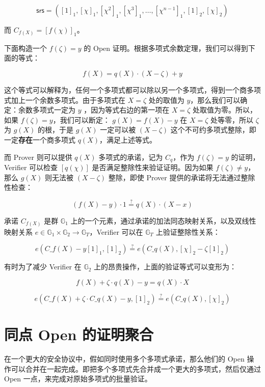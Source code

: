 \[
\mathsf{srs}=([1]_1,[\chi]_1,[\chi^2]_1,[\chi^3]_1,\ldots,[\chi^{n-1}]_1,[1]_2,[\chi]_2)
\]

而 \(C_{f(X)}=[f(\chi)]_1\)。

下面构造一个 \(f(\zeta) = y\) 的 Open
证明。根据多项式余数定理，我们可以得到下面的等式：

\[
f(X) = q(X)\cdot (X-\zeta) + y
\]

这个等式可以解释为，任何一个多项式都可以除以另一个多项式，得到一个商多项式加上一个余数多项式。由于多项式在
\(X=\zeta\) 处的取值为 \(y\)，那么我们可以确定：余数多项式一定为 \(y\)
，因为等式右边的第一项在 \(X=\zeta\) 处取值为零。所以，如果
\(f(\zeta)=y\)，我们可以断定： \(g(X) = f(X)-y\) 在 \(X=\zeta\)
处等零，所以 \(\zeta\) 为 \(g(X)\) 的根，于是 \(g(X)\) 一定可以被
\((X-\zeta)\) 这个不可约多项式整除，即一定\textbf{存在}一个商多项式
\(q(X)\)，满足上述等式。

而 Prover 则可以提供 \(q(X)\) 多项式的承诺，记为 \(C_q\)，作为
\(f(\zeta)=y\) 的证明，Verifier 可以检查 \([q(\chi)]\)
是否满足整除性来验证证明。因为如果 \(f(\zeta)\neq y\)，那么 \(g(X)\)
则无法被 \((X-\zeta)\) 整除，即使 Prover
提供的承诺将无法通过整除性检查：

\[
(f(X)-y)\cdot 1 \overset{?}{=} q(X) \cdot (X-x)
\]

承诺 \(C_{f(X)}\) 是群 \(\mathbb{G}_1\)
上的一个元素，通过承诺的加法同态映射关系，以及双线性映射关系
\(e\in \mathbb{G}_1\times\mathbb{G}_2\to \mathbb{G}_T\)，Verifier 可以在
\(\mathbb{G}_T\) 上验证整除性关系：

\[
e(C\_{f(X)} - y[1]_1, [1]_2) \overset{?}{=} e(C\_{q(X)}, [\chi]_2 - \zeta [1]_2)
\]

有时为了减少 Verifier 在 \(\mathbb{G}_2\)
上的昂贵操作，上面的验证等式可以变形为：

\[
f(X) + \zeta\cdot q(X) - y =  q(X)\cdot X
\]

\[
e(C\_{f(X)} + \zeta\cdot C\_{q(X)} -y, [1]_2)\overset{?}{=} e(C\_{q(X)}, [\chi]_2)
\]

\hypertarget{ux540cux70b9-open-ux7684ux8bc1ux660eux805aux5408}{%
\section{同点 Open
的证明聚合}\label{ux540cux70b9-open-ux7684ux8bc1ux660eux805aux5408}}

在一个更大的安全协议中，假如同时使用多个多项式承诺，那么他们的 Open
操作可以合并在一起完成。即把多个多项式先合并成一个更大的多项式，然后仅通过
Open 一点，来完成对原始多项式的批量验证。

